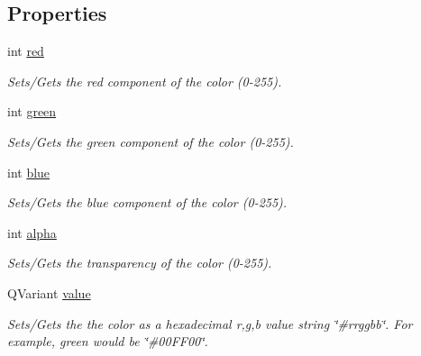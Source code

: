 \subsection*{Properties}
\begin{DoxyCompactItemize}
\item 
\hypertarget{class_picto_1_1_color_parameter_acd7e2a3dfb2725f41050a462f55c9924}{int \hyperlink{class_picto_1_1_color_parameter_acd7e2a3dfb2725f41050a462f55c9924}{red}}\label{class_picto_1_1_color_parameter_acd7e2a3dfb2725f41050a462f55c9924}

\begin{DoxyCompactList}\small\item\em Sets/\-Gets the red component of the color (0-\/255). \end{DoxyCompactList}\item 
\hypertarget{class_picto_1_1_color_parameter_a7cfab3390f7bee887cfa15e2e1cb82e6}{int \hyperlink{class_picto_1_1_color_parameter_a7cfab3390f7bee887cfa15e2e1cb82e6}{green}}\label{class_picto_1_1_color_parameter_a7cfab3390f7bee887cfa15e2e1cb82e6}

\begin{DoxyCompactList}\small\item\em Sets/\-Gets the green component of the color (0-\/255). \end{DoxyCompactList}\item 
\hypertarget{class_picto_1_1_color_parameter_a66635f542475b50f054ebb341a7d15ab}{int \hyperlink{class_picto_1_1_color_parameter_a66635f542475b50f054ebb341a7d15ab}{blue}}\label{class_picto_1_1_color_parameter_a66635f542475b50f054ebb341a7d15ab}

\begin{DoxyCompactList}\small\item\em Sets/\-Gets the blue component of the color (0-\/255). \end{DoxyCompactList}\item 
\hypertarget{class_picto_1_1_color_parameter_a6ad876eb5e2c6f853b0fb59e5f525363}{int \hyperlink{class_picto_1_1_color_parameter_a6ad876eb5e2c6f853b0fb59e5f525363}{alpha}}\label{class_picto_1_1_color_parameter_a6ad876eb5e2c6f853b0fb59e5f525363}

\begin{DoxyCompactList}\small\item\em Sets/\-Gets the transparency of the color (0-\/255). \end{DoxyCompactList}\item 
\hypertarget{class_picto_1_1_color_parameter_a700afed5bad517e99f81b1e2a343d2ad}{Q\-Variant \hyperlink{class_picto_1_1_color_parameter_a700afed5bad517e99f81b1e2a343d2ad}{value}}\label{class_picto_1_1_color_parameter_a700afed5bad517e99f81b1e2a343d2ad}

\begin{DoxyCompactList}\small\item\em Sets/\-Gets the the color as a hexadecimal r,g,b value string \char`\"{}\#rrggbb\char`\"{}. For example, green would be \char`\"{}\#00\-F\-F00\char`\"{}. \end{DoxyCompactList}\end{DoxyCompactItemize}
